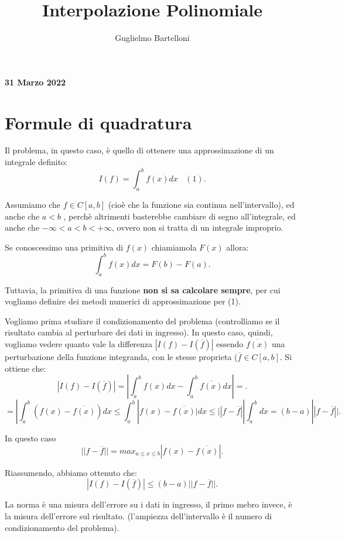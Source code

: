 \documentclass[11pt]{article}
\theoremstyle{definition}
\theoremstyle{plain}
\begin{document}
\title{Interpolazione Polinomiale}
\author{Guglielmo Bartelloni}
\maketitle

\thispagestyle{empty}

\begin{center}
{\LARGE \bf 31 Marzo 2022}\\
\end{center}

\section{Formule di quadratura}

Il problema, in questo caso, è quello di ottenere una approssimazione di un integrale definito:
\[
	I(f)=\int_{a}^{b}f(x)dx\ \ \ \ (1)
.\] 

Assumiamo che $f\in C[a,b]$ (cioè che la funzione sia continua nell'intervallo), ed anche che $a<b$ , perchè altrimenti basterebbe cambiare di segno all'integrale, ed anche che $-\infty<a<b<+\infty$, ovvero non si tratta di un integrale improprio.

Se conoscessimo una primitiva di $f(x)$ chiamiamola $F(x)$ allora:
\[
	\int_{a}^{b}f(x)dx=F(b)-F(a)
.\] 

Tuttavia, la primitiva di una funzione \textbf{non si sa calcolare sempre}, per cui vogliamo definire dei metodi numerici di approssimazione per (1).

Vogliamo prima studiare il condizionamento del problema (controlliamo se il risultato cambia al perturbare dei dati in ingresso). In questo caso, quindi, vogliamo vedere quanto vale la differenza $|I(f)-I(\overline{f})|$ essendo $\overline{f(x)}$ una perturbazione della funzione integranda, con le stesse proprieta ($\overline{f}\in C[a,b]$. Si ottiene che:
\[
	|I(f)-I(\overline{f})|=|\int_{a}^{b}f(x)dx-\int_{a}^{b}\overline{f(x)}dx|=
.\] 
\[
=|\int_{a}^{b}(f(x)-\overline{f(x)})dx\le \int_{a}^{b}|f(x)-\overline{f(x)}|dx\le ||f-\overline{f}||\int_{a}^{b}dx=(b-a)||f-\overline{f}||
.\] 

In questo caso
\[
	||f-\overline{f}||=max_{a\le x\le b}|f(x)-\overline{f(x)}|
.\] 

Riassumendo, abbiamo ottenuto che:
\[
	|I(f)-I(\overline{f})|\le (b-a)||f-\overline{f}||
.\] 

La norma è una misura dell'errore su i dati in ingresso, il primo mebro invece, è la misura dell'errore sul risultato. (l'ampiezza dell'intervallo è il numero di condizionamento del problema).
\end{document}

